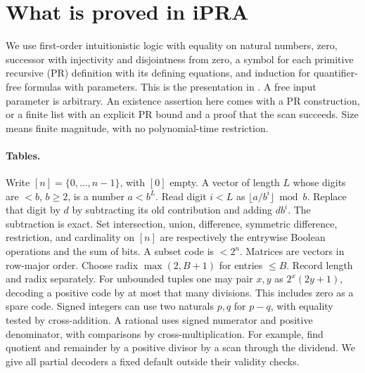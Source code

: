 \section{What is proved in iPRA}\label{sec:logic}
We use first-order intuitionistic logic with equality on natural numbers,
zero, successor with injectivity and disjointness from zero, a symbol for each
primitive recursive (PR) definition with its defining equations, and induction
for quantifier-free formulas with parameters. This is the presentation in
. A free input parameter is
arbitrary. An existence assertion here comes with a PR construction, or a
finite list with an explicit PR bound and a proof that the scan succeeds.
Size means finite magnitude, with no polynomial-time restriction.

\paragraph{Tables.}
Write $[n]=\{0,\ldots,n-1\}$, with $[0]$ empty. A vector of length $L$ whose
digits are $<b$, $b\ge2$, is a number $a<b^L$. Read digit $i<L$ as
$\lfloor a/b^i\rfloor\bmod b$. Replace that digit by $d$ by subtracting its old
contribution and adding $db^i$. The subtraction is exact. Set intersection,
union, difference, symmetric difference, restriction, and cardinality on
$[n]$ are respectively the entrywise Boolean operations and the sum of bits.
A subset code is $<2^n$. Matrices are vectors in row-major order. Choose radix
$\max(2,B+1)$ for entries $\le B$. Record length and radix separately. For
unbounded tuples one may pair $x,y$ as $2^x(2y+1)$, decoding a positive code
by at most that many divisions. This includes zero as a spare code. Signed
integers can use two naturals $p,q$ for $p-q$, with equality tested by
cross-addition. A rational uses signed numerator and positive denominator,
with comparisons by cross-multiplication. For example, find quotient and
remainder by a positive divisor by a scan through the dividend. We give
all partial decoders a fixed default outside their validity checks.

